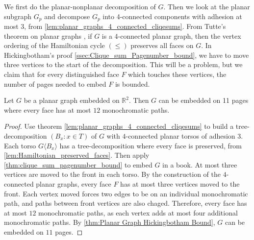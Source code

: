 We first do the planar-nonplanar decomposition of \(G\).
Then we look at the planar subgraph \(G_p\) and decompose \(G_p\) into 4-connected components with adhesion at most 3, from \cref{lem:planar_graphs_4_connected_cliqesums}.
From Tutte's theorem on planar graphs \cite{tutteTheoremPlanarGraphs1956}, if \(G\) is a 4-connected planar graph, then the vertex ordering of the Hamiltonian cycle \((\leq)\) preserves all faces on \(G\).
In Hickingbotham's proof \cref{ssec:Clique_sum_Pagenumber_bound}, we have to move three vertices to the start of the decomposition. This will be a problem, but we claim that for every distinguished face \(F\) which touches these vertices, the number of pages needed to embed \(F\) is bounded.


\begin{theorem}\label{thm:embedded_graph}
	Let \( G \) be a planar graph embedded on $\mathbb{R}^2$. Then $G$ can be embedded on 11 pages where every face has at most $12$ monochromatic paths. 
\end{theorem}

\begin{proof}
	Use theorem \cref{lem:planar_graphs_4_connected_cliqesums} to build a tree-decomposition $(B_x : x \in T)$ of $G$ with $4$-connected planar torsos of adhesion 3. Each torso $G \langle B_x \rangle$ has a tree-decomposition where every face is preserved, from \cref{lem:Hamiltonian_preserved_faces}. Then apply \cref{thm:clique_sum_pagenumber_bound} to embed $G$ in a book. At most three vertices are moved to the front in each torso. By the construction of the $4$-connected planar graphs, every face $F$ has at most three vertices moved to the front. Each vertex moved forces two edges to be on an individual monochromatic path, and paths between front vertices are also chaged. Therefore, every face has at most $12$ monochromatic paths, as each vertex adds at most four additional monochromatic paths. By \cref{thm:Planar Graph Hickingbotham Bound}, $G$ can be embedded on $11$ pages.
\end{proof}